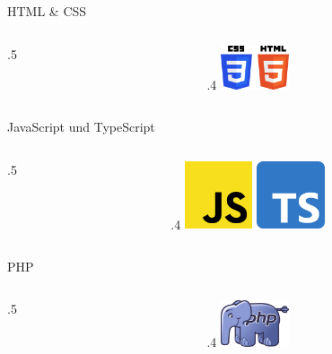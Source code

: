 \begin{frame}{HTML \& CSS}
    \begin{columns}
        \begin{column}{.5\framewidth}

        \end{column}
        \begin{column}{.4\framewidth}
            \includegraphics[width=2cm]{resources/logos/CSS3_HTML5}
        \end{column}
    \end{columns}
\end{frame}
\begin{frame}{JavaScript und TypeScript}
    \begin{columns}
        \begin{column}{.5\framewidth}

        \end{column}
        \begin{column}{.4\framewidth}
            \includegraphics[width=2cm]{resources/logos/js}
            \includegraphics[width=2cm]{resources/logos/ts}
        \end{column}
    \end{columns}
\end{frame}
\begin{frame}{PHP}
    \begin{columns}
        \begin{column}{.5\framewidth}

        \end{column}
        \begin{column}{.4\framewidth}
            \includegraphics[width=2cm]{resources/logos/php}
        \end{column}
    \end{columns}
\end{frame}
